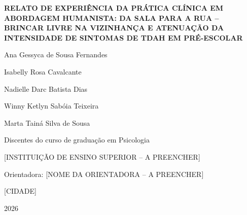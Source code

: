 \begin{center}
\vspace*{0.5cm}

{\large\bfseries RELATO DE EXPERI\^ENCIA DA PR\'ATICA CL\'INICA EM ABORDAGEM HUMANISTA: DA SALA PARA A RUA -- BRINCAR LIVRE NA VIZINHAN\c{C}A E ATENUA\c{C}\~AO DA INTENSIDADE DE SINTOMAS DE TDAH EM PR\'E-ESCOLAR\par}

\vspace{2.0cm}

{\normalsize Ana Gessyca de Sousa Fernandes\par}
{\normalsize Isabelly Rosa Cavalcante\par}
{\normalsize Nadielle Darc Batista Dias\par}
{\normalsize Winny Ketlyn Sab\'oia Teixeira\par}
{\normalsize Marta Tain\'a Silva de Sousa\par}

\vspace{1.5cm}

{\normalsize Discentes do curso de gradua\c{c}\~ao em Psicologia\par}
{\normalsize [INSTITUI\c{C}\~AO DE ENSINO SUPERIOR -- A PREENCHER]\par}
{\normalsize Orientadora: [NOME DA ORIENTADORA -- A PREENCHER]\par}

\vspace{3.0cm}

{\normalsize [CIDADE]\par}
{\normalsize 2026\par}

\end{center}
\thispagestyle{empty}
\newpage
